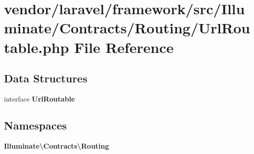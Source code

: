 \section{vendor/laravel/framework/src/\+Illuminate/\+Contracts/\+Routing/\+Url\+Routable.php File Reference}
\label{_url_routable_8php}
\subsection*{Data Structures}
\begin{DoxyCompactItemize}
\item 
interface {\bf Url\+Routable}
\end{DoxyCompactItemize}
\subsection*{Namespaces}
\begin{DoxyCompactItemize}
\item 
 {\bf Illuminate\textbackslash{}\+Contracts\textbackslash{}\+Routing}
\end{DoxyCompactItemize}
